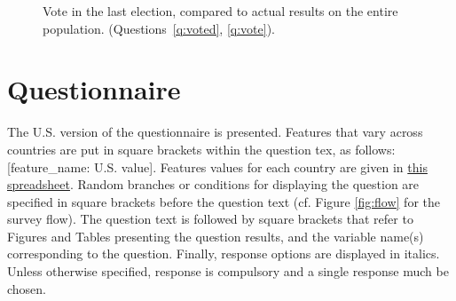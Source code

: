 \begin{figure}[h!]
    \caption[Vote in the last election compared to actual results (entire population)]{Vote in the last election, compared to actual results on the entire population. (Questions~\ref{q:voted}, \ref{q:vote}).
    }\label{fig:vote_representativeness}
\end{figure}



\renewcommand{\theenumi}{\arabic{enumi}}
\clearpage
\section{Questionnaire}\label{app:questionnaire}
The U.S. version of the questionnaire is presented. Features that vary across countries are put in square brackets within the question tex, as follows: [feature\_name: U.S. value]. Features values for each country are given in \href{https://github.com/bixiou/robustness_global_redistr/raw/main/questionnaire/sources.xlsx}{this spreadsheet}. 
Random branches or conditions for displaying the question are specified in square brackets before the question text (cf. Figure \ref{fig:flow} for the survey flow). The question text is followed by square brackets that refer to Figures and Tables presenting the question results, and the variable name(s) corresponding to the question. Finally, response options are displayed in italics. 
Unless otherwise specified, response is compulsory and a single response much be chosen.

